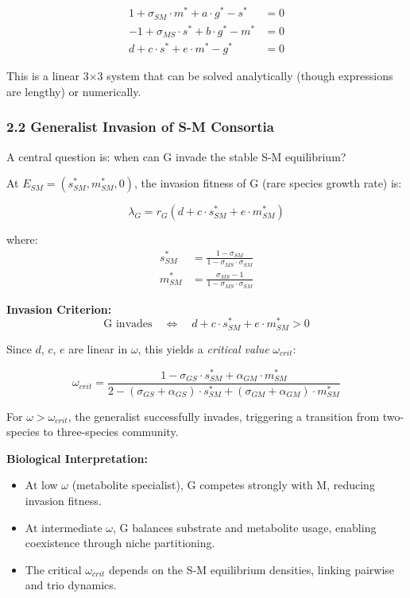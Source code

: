 \documentclass[11pt]{article}
\begin{document}
\begin{align}
1 + \sigma_{SM} \cdot m^* + a \cdot g^* - s^* &= 0\\
-1 + \sigma_{MS} \cdot s^* + b \cdot g^* - m^* &= 0\\
d + c \cdot s^* + e \cdot m^* - g^* &= 0
\end{align}

This is a linear 3$\times$3 system that can be solved analytically (though expressions are lengthy) or numerically.

\subsubsection{2.2 Generalist Invasion of S-M Consortia}

A central question is: when can G invade the stable S-M equilibrium?

At $E_{SM} = (s^*_{SM}, m^*_{SM}, 0)$, the invasion fitness of G (rare species growth rate) is:

\begin{equation}
\lambda_G = r_G \left(d + c \cdot s^*_{SM} + e \cdot m^*_{SM}\right)
\end{equation}

where:
\begin{align}
s^*_{SM} &= \frac{1-\sigma_{SM}}{1-\sigma_{MS}\cdot\sigma_{SM}}\\
m^*_{SM} &= \frac{\sigma_{MS}-1}{1-\sigma_{MS}\cdot\sigma_{SM}}
\end{align}

\textbf{Invasion Criterion:}
\begin{equation}
\boxed{\text{G invades} \quad \Leftrightarrow \quad d + c \cdot s^*_{SM} + e \cdot m^*_{SM} > 0}
\end{equation}

Since $d$, $c$, $e$ are linear in $\omega$, this yields a \textit{critical value} $\omega_{crit}$:

\begin{equation}
\omega_{crit} = \frac{1 - \sigma_{GS} \cdot s^*_{SM} + \alpha_{GM} \cdot m^*_{SM}}{2 - (\sigma_{GS}+\alpha_{GS}) \cdot s^*_{SM} + (\sigma_{GM}+\alpha_{GM}) \cdot m^*_{SM}}
\end{equation}

For $\omega > \omega_{crit}$, the generalist successfully invades, triggering a transition from two-species to three-species community.

\textbf{Biological Interpretation:}
\begin{itemize}
\item At low $\omega$ (metabolite specialist), G competes strongly with M, reducing invasion fitness.
\item At intermediate $\omega$, G balances substrate and metabolite usage, enabling coexistence through niche partitioning.
\item The critical $\omega_{crit}$ depends on the S-M equilibrium densities, linking pairwise and trio dynamics.
\end{itemize}
\end{document}
